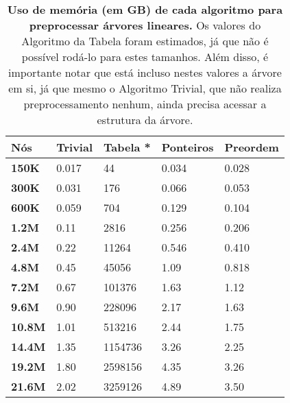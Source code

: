 \begin{table}[H]
  \begin{tabular}{|l|l|l|l|l|}
  \hline
  \textbf{Nós}            & \textbf{Trivial} & \textbf{Tabela *} & \textbf{Ponteiros} & \textbf{Preordem} \\ \hline
  \textbf{150K}  & 0.017            & 44                & 0.034              & 0.028             \\ \hline
  \textbf{300K}  & 0.031            & 176               & 0.066              & 0.053             \\ \hline
  \textbf{600K}  & 0.059            & 704               & 0.129              & 0.104             \\ \hline
  \textbf{1.2M}  & 0.11             & 2816              & 0.256              & 0.206             \\ \hline
  \textbf{2.4M}  & 0.22             & 11264             & 0.546              & 0.410             \\ \hline
  \textbf{4.8M}  & 0.45             & 45056             & 1.09               & 0.818             \\ \hline
  \textbf{7.2M}  & 0.67             & 101376            & 1.63               & 1.12              \\ \hline
  \textbf{9.6M}  & 0.90             & 228096            & 2.17               & 1.63              \\ \hline
  \textbf{10.8M} & 1.01             & 513216            & 2.44               & 1.75              \\ \hline
  \textbf{14.4M} & 1.35             & 1154736           & 3.26               & 2.25              \\ \hline
  \textbf{19.2M} & 1.80             & 2598156           & 4.35               & 3.26              \\ \hline
  \textbf{21.6M} & 2.02             & 3259126           & 4.89               & 3.50              \\ \hline
  \end{tabular}
  \caption[Uso de memória (em GB) de cada algoritmo para preprocessar árvores lineares.]
  {\textbf{Uso de memória (em GB) de cada algoritmo para preprocessar árvores lineares.}
   Os valores do Algoritmo da Tabela foram estimados, já que não é possível rodá-lo
   para estes tamanhos. Além disso, é importante notar que está incluso nestes valores
   a árvore em si, já que mesmo o Algoritmo Trivial, que não realiza preprocessamento
   nenhum, ainda precisa acessar a estrutura da árvore.}
  \end{table}

